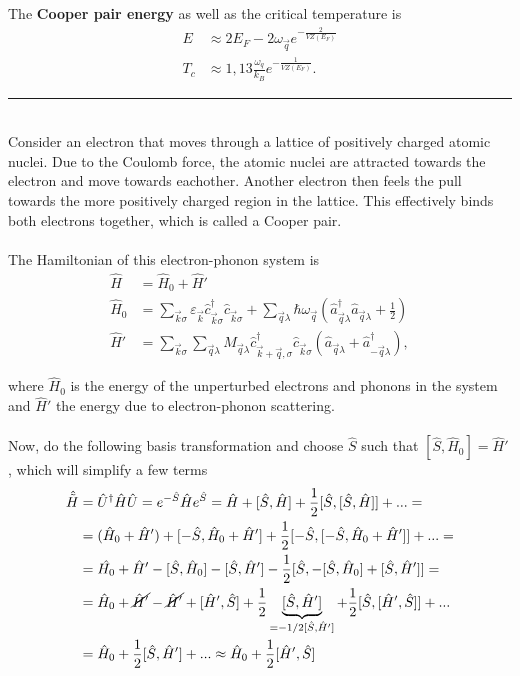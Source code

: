 \documentclass{article}
\newcommand{\lr}[1]{\left(#1\right)}
\begin{document}
The \textbf{Cooper pair energy} as well as the critical temperature is
	\begin{align}
		E &\approx 2 E_F - 2 \omega_{\vec{q}} e^{- \frac{2}{V Z(E_F)}} \\
		T_c &\approx 1,13 \frac{\omega_q}{k_B} e^{- \frac{1}{V Z(E_F)}}.
	\end{align}


\newpage


{\color{violet}
\hrule
	\\
	Consider an electron that moves through a lattice of positively charged atomic nuclei. Due to the Coulomb force, the atomic nuclei are attracted towards the electron and move towards eachother. Another electron then feels the pull towards the more positively charged region in the lattice. This effectively binds both electrons together, which is called a Cooper pair.\\
	\\
	The Hamiltonian of this electron-phonon system is
		\begin{align*}
			\hat{H} &= \hat{H}_0 + \hat{H}' \\
			\hat{H}_0 &= \sum_{\vec{k}\sigma} \varepsilon_{\vec{k}} \hat{c}_{\vec{k}\sigma}^\dagger \hat{c}_{\vec{k}\sigma} + \sum_{\vec{q}\lambda} \hbar\omega_{\vec{q}} \lr{ \hat{a}_{\vec{q}\lambda}^\dagger \hat{a}_{\vec{q}\lambda} + \frac{1}{2} } \\
			\hat{H}' &= \sum_{\vec{k}\sigma} \sum_{\vec{q}\lambda} M_{\vec{q}\lambda} \hat{c}_{\vec{k}+\vec{q},\sigma}^\dagger \hat{c}_{\vec{k}\sigma} \lr{ \hat{a}_{\vec{q}\lambda} + \hat{a}_{-\vec{q}\lambda}^\dagger },
		\end{align*}

	where $\hat{H}_0$ is the energy of the unperturbed electrons and phonons in the system and $\hat{H}'$ the energy due to electron-phonon scattering.\\
	\\
	Now, do the following basis transformation and choose $\hat{S}$ such that $[\hat{S},\hat{H}_0]=\hat{H}'$, which will simplify a few terms
		\begin{align*}
			\hat{\tilde{H}} &= \hat{U}^\dagger \hat{H} \hat{U} = e^{-\hat{S}} \hat{H} e^{\hat{S}} = \hat{H} + [\hat{S},\hat{H}] + \frac{1}{2}[\hat{S},[\hat{S},\hat{H}]] + ... = \\
			&= (\hat{H}_0 + \hat{H}') + [-\hat{S},\hat{H}_0 + \hat{H}'] + \frac{1}{2}[-\hat{S},[-\hat{S},\hat{H}_0 + \hat{H}']] + ... = \\
			&= \hat{H_0} + \hat{H}' - [\hat{S},\hat{H}_0] - [\hat{S},\hat{H}'] - \frac{1}{2} [\hat{S},-[\hat{S},\hat{H}_0] + [\hat{S},\hat{H}']] = \\
			&= \hat{H}_0 + \cancel{\hat{H}'} - \cancel{\hat{H}'} + [\hat{H}',\hat{S}] + \frac{1}{2} \underbrace{ [\hat{S},\hat{H}'] }_{=-1/2[\hat{S},\hat{H}']} + \frac{1}{2}[\hat{S},[\hat{H}',\hat{S}]] + ... \\
			&= \hat{H}_0 + \frac{1}{2}[\hat{S},\hat{H}'] + ... \approx \hat{H}_0 + \frac{1}{2}[\hat{H}',\hat{S}]
		\end{align*}

}
\end{document}
